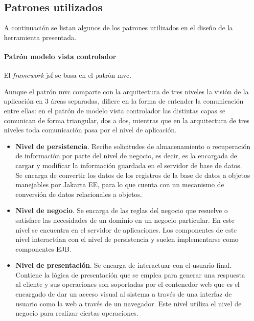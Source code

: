 \subsection{Patrones utilizados}
\label{sub:patrones}

A continuación se listan algunos de los patrones utilizados en el diseño de la herramienta presentada.



\paragraph{Patrón modelo vista controlador}
El \emph{framework} \acrshort{jsf} se basa en el patrón \acrlong{mvc}.

Aunque el patrón \acrshort{mvc} comparte con la arquitectura de tres niveles la visión de la aplicación en 3 áreas separadas, difiere en la forma de entender la comunicación entre ellas: en el patrón de modelo vista controlador las distintas capas se comunican de forma triangular, dos a dos, mientras que en la arquitectura de tres niveles toda comunicación pasa por el nivel de aplicación.
\begin{itemize}
\item \textbf{Nivel de persistencia}. Recibe solicitudes de almacenamiento o recuperación de información por parte del nivel de negocio, es decir, es la encargada de cargar y modificar la información guardada en el servidor de base de datos. Se encarga de convertir los datos de los registros de la base de datos a objetos manejables por Jakarta EE, para lo que cuenta con un mecanismo de conversión de datos relacionales a objetos. 
\item \textbf{Nivel de negocio}. Se encarga de las reglas del negocio que resuelve o satisface las necesidades de un dominio en un negocio particular. En este nivel se encuentra en el servidor de aplicaciones. Los componentes de este nivel interactúan con el nivel de persistencia y suelen implementarse como componentes EJB.
\item \textbf{Nivel de presentación}. Se encarga de interactuar con el usuario final. Contiene la lógica de presentación que se emplea para generar una respuesta al cliente y sus operaciones son soportadas por el contenedor web que es el encargado de dar un acceso visual al sistema a través de una interfaz de usuario como la web a través de un navegador. Este nivel utiliza el nivel de negocio para realizar ciertas operaciones.
\end{itemize}


